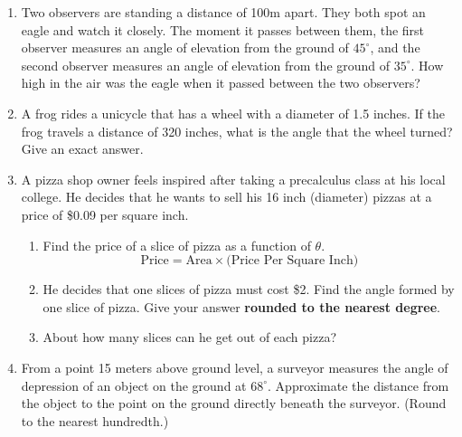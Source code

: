 \begin{enumerate}

\item Two observers are standing a distance of 100m apart.  They both
  spot an eagle and watch it closely.  The moment it passes between
  them, the first observer measures an angle of elevation from the
  ground of $45^\circ$, and the second observer measures an angle of
  elevation from the ground of $35^\circ.$ How high in the air was the
  eagle when it passed between the two observers?

  \vfill
  \vfill

\item A frog rides a unicycle that has a wheel with a diameter of 1.5
  inches.  If the frog travels a distance of 320 inches, what is the
  angle that the wheel turned?  Give an exact answer.

  \vfill


\newpage


\item A pizza shop owner feels inspired after taking a precalculus class at his local college.  He decides that he wants to sell his 16 inch (diameter) pizzas at a price of \$0.09 per square inch.
\begin{enumerate}
\item Find the price of a slice of pizza as a function of $\theta$.
$$\text{Price}=\text{Area}\times \text{(Price Per Square Inch)}$$\vfill
\item He decides that one slices of pizza must cost \$2.  Find the angle formed by one slice of pizza.  Give your answer \textbf{rounded to the nearest degree}.\vfill
\item About how many slices can he get out of each pizza?\vfill

\end{enumerate}




\item From a point 15 meters above ground level, a surveyor measures the angle of depression of an object on the ground at $68^\circ$.  Approximate the distance from the object to the point on the ground directly beneath the surveyor. (Round to the nearest hundredth.) \vfill
\newpage


\end{enumerate}
